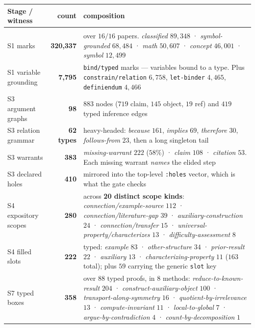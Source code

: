 \begin{center}
\small
\begin{tabular}{p{} r p{}}
\textbf{Stage / witness} & \textbf{count} & \textbf{composition}\\
\hline\\[-8pt]
S1 marks & \textbf{320{,}337} &
over $16/16$ papers. \emph{classified} $89{,}348$ · \emph{symbol-grounded}
$68{,}484$ · \emph{math} $50{,}607$ · \emph{concept} $46{,}001$ · \emph{symbol}
$12{,}499$\\[3pt]
S1 variable grounding & \textbf{7{,}795} &
\texttt{bind/typed} marks --- variables bound to a type. Plus
\texttt{constrain/relation} $6{,}758$, \texttt{let-binder} $4{,}465$,
\texttt{definiendum} $4{,}466$\\[3pt]
S3 argument graphs & \textbf{98} &
$883$ nodes ($719$ claim, $145$ object, $19$ ref) and $419$ typed inference
edges\\[3pt]
S3 relation grammar & \textbf{62 types} &
heavy-headed: \emph{because} $161$, \emph{implies} $69$, \emph{therefore} $30$,
\emph{follows-from} $23$, then a long singleton tail\\[3pt]
S3 warrants & \textbf{383} &
\emph{missing-warrant} $222$ ($58\%$) · \emph{claim} $108$ · \emph{citation}
$53$. Each missing warrant \emph{names} the elided step\\[3pt]
S3 declared holes & \textbf{410} &
mirrored into the top-level \texttt{:holes} vector, which is what the gate
checks\\[3pt]
S4 expository scopes & \textbf{280} &
across \textbf{20 distinct scope kinds}: \emph{connection/example-source} $112$
· \emph{connection/literature-gap} $39$ · \emph{auxiliary-construction} $24$ ·
\emph{connection/transfer} $15$ · \emph{universal-property/characterizes} $13$ ·
\emph{difficulty-assessment} $8$\\[3pt]
S4 filled slots & \textbf{222} &
typed: \emph{example} $83$ · \emph{other-structure} $34$ ·
\emph{prior-result} $22$ · \emph{auxiliary} $13$ ·
\emph{characterizing-property} $11$ ($163$ total); plus $59$ carrying the
generic \texttt{slot} key\\[3pt]
S7 typed boxes & \textbf{358} &
over $88$ typed proofs, in $8$ methods: \emph{reduce-to-known-result} $204$ ·
\emph{construct-auxiliary-object} $100$ · \emph{transport-along-symmetry} $16$ ·
\emph{quotient-by-irrelevance} $13$ · \emph{compute-invariant} $11$ ·
\emph{local-to-global} $7$ · \emph{argue-by-contradiction} $4$ ·
\emph{count-by-decomposition} $1$\\[3pt]

\end{tabular}
\end{center}
